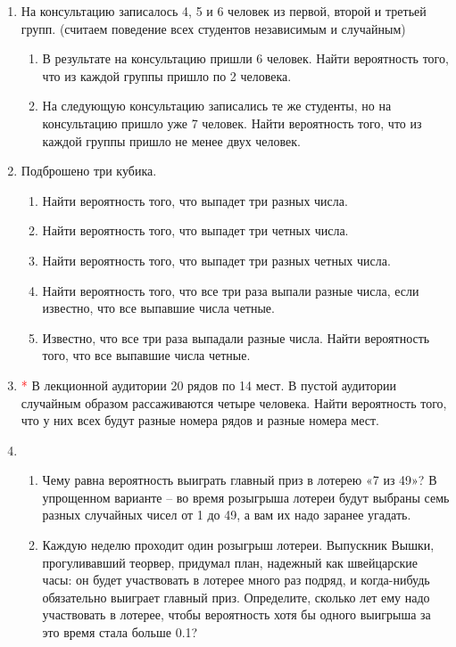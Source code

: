 \documentclass{article}
\begin{document}
\begin{enumerate}
    \item На консультацию записалось 4, 5 и 6 человек из первой, второй и третьей групп. (считаем поведение всех студентов независимым и случайным)
    \begin{enumerate}
        \item В результате на консультацию пришли 6 человек. Найти вероятность того, что из каждой группы пришло по 2 человека.
        \item На следующую консультацию записались те же студенты, но на консультацию пришло уже 7 человек. Найти вероятность того, что из каждой группы пришло не менее двух человек.
    \end{enumerate}

    \item Подброшено три кубика.
    \begin{enumerate}
        \item Найти вероятность того, что выпадет три разных числа.
        \item Найти вероятность того, что выпадет три четных числа.
        \item Найти вероятность того, что выпадет три разных четных числа.
        \item Найти вероятность того, что все три раза выпали разные числа, если известно, что все выпавшие числа четные.
        \item Известно, что все три раза выпадали разные числа. Найти вероятность того, что все выпавшие числа четные.
    \end{enumerate}

    \item \textcolor{red}{*} В лекционной аудитории 20 рядов по 14 мест. В пустой аудитории случайным образом рассаживаются четыре человека. Найти вероятность того, что у них всех будут разные номера рядов и разные номера мест.

    \item 
    \begin{enumerate}
        \item Чему равна вероятность выиграть главный приз в лотерею «7 из 49»? В упрощенном варианте -- во время розыгрыша лотереи будут выбраны семь разных случайных чисел от 1 до 49, а вам их надо заранее угадать.
        \item Каждую неделю проходит один розыгрыш лотереи. Выпускник Вышки, прогуливавший теорвер, придумал план, надежный как швейцарские часы: он будет участвовать в лотерее много раз подряд, и когда-нибудь обязательно выиграет главный приз. Определите, сколько лет ему надо участвовать в лотерее, чтобы вероятность хотя бы одного выигрыша за это время стала больше 0.1?
    \end{enumerate}


\end{enumerate}
\end{document}
